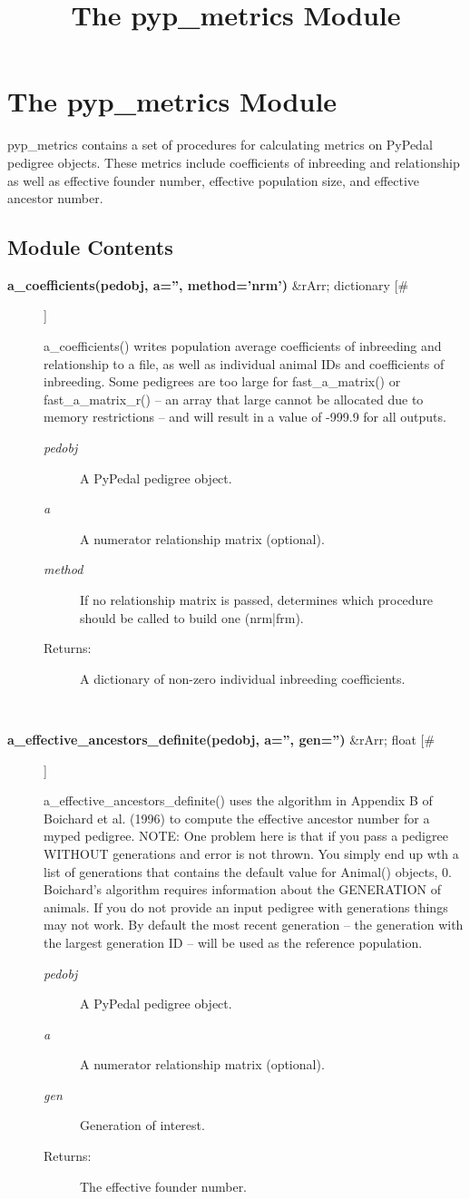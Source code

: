 \documentclass[10pt]{article}
\title{The pyp\_metrics Module}
\begin{document}
\section*{The pyp\_metrics Module}


 pyp\_metrics contains a set of procedures for calculating metrics on PyPedal pedigree objects. These metrics include coefficients of inbreeding and relationship as well as effective founder number, effective population size, and effective ancestor number.
\subsection*{Module Contents}
\begin{description}
\item[\textbf{a\_coefficients(pedobj, a='', method='nrm')}
 \&rArr; dictionary [\#]]

 a\_coefficients() writes population average coefficients of inbreeding and relationship to a file, as well as individual animal IDs and coefficients of inbreeding. Some pedigrees are too large for fast\_a\_matrix() or fast\_a\_matrix\_r() -- an array that large cannot be allocated due to memory restrictions -- and will result in a value of -999.9 for all outputs.
\begin{description}
\item[\emph{pedobj}
] A PyPedal pedigree object.
\item[\emph{a}
] A numerator relationship matrix (optional).
\item[\emph{method}
] If no relationship matrix is passed, determines which procedure should be called to build one (nrm|frm).
\item[Returns:] A dictionary of non-zero individual inbreeding coefficients.

\end{description}
\\ 

\item[\textbf{a\_effective\_ancestors\_definite(pedobj, a='', gen='')}
 \&rArr; float [\#]]

 a\_effective\_ancestors\_definite() uses the algorithm in Appendix B of Boichard et al. (1996) to compute the effective ancestor number for a myped pedigree. NOTE: One problem here is that if you pass a pedigree WITHOUT generations and error is not thrown. You simply end up wth a list of generations that contains the default value for Animal() objects, 0. Boichard's algorithm requires information about the GENERATION of animals. If you do not provide an input pedigree with generations things may not work. By default the most recent generation -- the generation with the largest generation ID -- will be used as the reference population.
\begin{description}
\item[\emph{pedobj}
] A PyPedal pedigree object.
\item[\emph{a}
] A numerator relationship matrix (optional).
\item[\emph{gen}
] Generation of interest.
\item[Returns:] The effective founder number.


\end{description}
\end{description}
\end{document}

